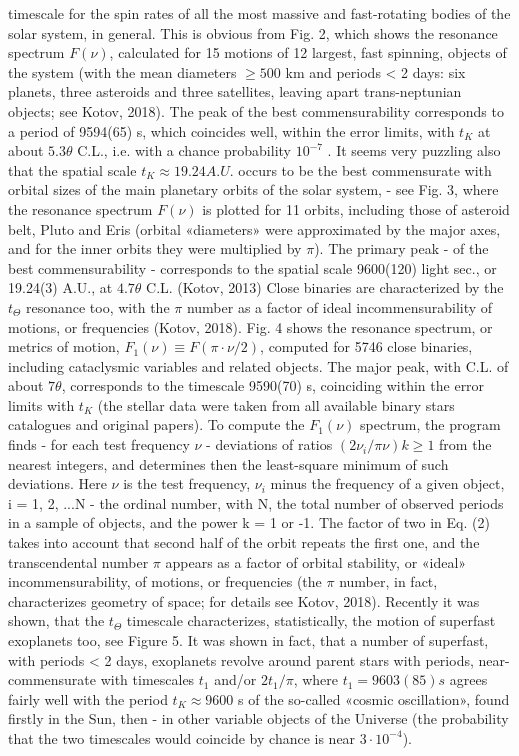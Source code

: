 \documentclass[twoside,draft]{article}
\begin{document}
{timescale for the spin rates of all the most massive and fast-rotating bodies of the solar system, in
general.
This is obvious from Fig. 2, which shows the resonance spectrum $F( \nu )$, calculated for 15
motions of 12 largest, fast spinning, objects of the system (with the mean diameters $\geq 500$ km and
periods < 2 days: six planets, three asteroids and three satellites, leaving apart trans-neptunian
objects; see Kotov, 2018). The peak of the best commensurability corresponds to a period of
9594(65) s, which coincides well, within the error limits, with $t_K$ at about $5.3 \theta$ C.L., i.e. with a
chance probability $10^{-7}$ .
It seems very puzzling also that the spatial scale $t_{K} \approx 19.24 A.U.$ occurs to be the best
commensurate with orbital sizes of the main planetary orbits of the solar system, - see Fig. 3,
where the resonance spectrum $F( \nu )$ is plotted for 11 orbits, including those of asteroid belt, Pluto
and Eris (orbital «diameters» were approximated by the major axes, and for the inner orbits they
were multiplied by $\pi$). The primary peak - of the best commensurability - corresponds to the
spatial scale 9600(120) light sec., or 19.24(3) A.U., at $4.7 \theta$ C.L. (Kotov, 2013)
Close binaries are characterized by the $t_{\Theta}$ resonance too, with the $\pi$ number as a factor of ideal
incommensurability of motions, or frequencies (Kotov, 2018). Fig. 4 shows the resonance spectrum,
or metrics of motion, $F_{1} (\nu) \equiv F(\pi \cdot \nu/2)$, computed for 5746 close binaries, including cataclysmic
variables and related objects. The major peak, with C.L. of about $7 \theta$, corresponds to the timescale
9590(70) s, coinciding within the error limits with $t_{K}$ (the stellar data were taken from all available
binary stars catalogues and original papers).
To compute the $F_{1} (\nu)$ spectrum, the program finds - for each test frequency $\nu$ - deviations of
ratios $(2\nu_{i} /\pi \nu) k \geq 1$ from the nearest integers, and determines then the least-square minimum of such
deviations. Here $\nu$ is the test frequency, $\nu_{i}$ minus the frequency of a given object, i = 1, 2, ...N - the
ordinal number, with N, the total number of observed periods in a sample of objects, and the power
k = 1 or -1. The factor of two in Eq. (2) takes into account that second half of the orbit repeats the
first one, and the transcendental number $\pi$ appears as a factor of orbital stability, or «ideal»
incommensurability, of motions, or frequencies (the $\pi$ number, in fact, characterizes geometry of
space; for details see Kotov, 2018).
Recently it was shown, that the $t_{\Theta}$ timescale characterizes, statistically, the motion of superfast
exoplanets too, see Figure 5.
It was shown in fact, that a number of superfast, with periods < 2 days, exoplanets revolve
around parent stars with periods, near-commensurate with timescales $t_{1}$ and/or $2 t_{1}/\pi$, where $t_{1} =
9603(85) s$ agrees fairly well with the period $t_{K} \approx 9600$ s of the so-called «cosmic oscillation», found
firstly in the Sun, then - in other variable objects of the Universe (the probability that the two
timescales would coincide by chance is near $3 \cdot 10^{-4}$).

}
\end{document}
